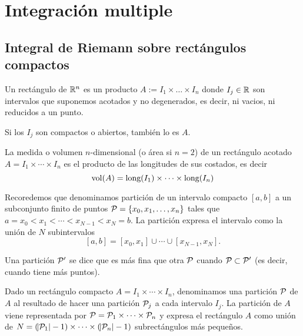 \chapter{Integración multiple}

\section{Integral de Riemann sobre rectángulos compactos}

\begin{defi}
    Un rectángulo de $\mathbb{R}^n$ es un producto $A := I_1 \times \dots \times I_n$
    donde $I_j \in \mathbb{R}$ son intervalos que suponemos acotados y no degenerados,
    es decir, ni vacios, ni reducidos a un punto.

    Si los $I_j$ son compactos o abiertos, también lo es $A$.
\end{defi}

\begin{defi}
    La medida o volumen $n$-dimensional (o área si $n=2$) de un rectángulo
    acotado $A = I_1 \times \cdots \times I_n$ es el producto de las longitudes
    de sus costados, es decir
    \[
        \operatorname{vol}(A) = \text{long} (I_1) \times \dots \times \text{long} (I_n)
    \]
\end{defi}

\begin{obs}
    Recoredemos que denominamos partición de un intervalo compacto $[a,b]$ a un
    subconjunto finito de puntos $\mathcal{P}=\left\{x_0,x_1,\dots,x_n\right\}$ tales que
    $a = x_0 < x_1 < \cdots < x_{N-1} < x_N = b$. La partición expresa el intervalo
    como la unión de $N$ subintervalos
    \[
        [a,b] = [x_0,x_1] \cup \cdots \cup [x_{N-1},x_N].
    \]
\end{obs}
\begin{obs*}
    Una partición $\mathcal{P}^\prime$ se dice que es más fina que otra
    $\mathcal{P}$ cuando $\mathcal{P} \subset \mathcal{P}^\prime$ (es decir, cuando
    tiene más puntos).
\end{obs*}

\begin{defi}
    Dado un rectángulo compacto $A = I_1 \times \cdots \times I_n$, denominamos
    una partición $\mathcal{P}$ de $A$ al resultado de hacer una partición $\mathcal{P}_j$ a cada
    intervalo $I_j$.
    La partición de $A$ viene representada por $\mathcal{P} = \mathcal{P}_1 \times \cdots \times
    \mathcal{P}_n$ y expresa el rectángulo $A$ como unión de $N = (\abs{\mathcal{P}_1}-1) \times
    \cdots \times (\abs{\mathcal{P}_n}-1)$ subrectángulos más pequeños.
\end{defi}

